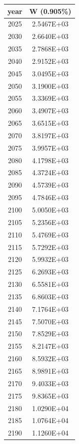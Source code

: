 \documentclass[a4paper]{article}
\begin{document}
	\noindent
	\begin{tabular}{|c|c|}
		\hline
		year & W (0.905\%) \\
		\hline
		2025 & 2.5467E+03 \\
		\hline
		2030 & 2.6640E+03 \\
		\hline
		2035 & 2.7868E+03 \\
		\hline
		2040 & 2.9152E+03 \\
		\hline
		2045 & 3.0495E+03 \\
		\hline
		2050 & 3.1900E+03 \\
		\hline
		2055 & 3.3369E+03 \\
		\hline
		2060 & 3.4907E+03 \\
		\hline
		2065 & 3.6515E+03 \\
		\hline
		2070 & 3.8197E+03 \\
		\hline
		2075 & 3.9957E+03 \\
		\hline
		2080 & 4.1798E+03 \\
		\hline
		2085 & 4.3724E+03 \\
		\hline
		2090 & 4.5739E+03 \\
		\hline
		2095 & 4.7846E+03 \\
		\hline
		2100 & 5.0050E+03 \\
		\hline
		2105 & 5.2356E+03 \\
		\hline
		2110 & 5.4769E+03 \\
		\hline
		2115 & 5.7292E+03 \\
		\hline
		2120 & 5.9932E+03 \\
		\hline
		2125 & 6.2693E+03 \\
		\hline
		2130 & 6.5581E+03 \\
		\hline
		2135 & 6.8603E+03 \\
		\hline
		2140 & 7.1764E+03 \\
		\hline
		2145 & 7.5070E+03 \\
		\hline
		2150 & 7.8529E+03 \\
		\hline
		2155 & 8.2147E+03 \\
		\hline
		2160 & 8.5932E+03 \\
		\hline
		2165 & 8.9891E+03 \\
		\hline
		2170 & 9.4033E+03 \\
		\hline
		2175 & 9.8365E+03 \\
		\hline
		2180 & 1.0290E+04 \\
		\hline
		2185 & 1.0764E+04 \\
		\hline
		2190 & 1.1260E+04 \\
		\hline

\end{tabular}
\end{document}
